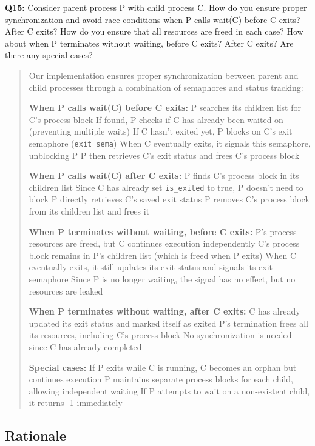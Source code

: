 \documentclass[a4paper,11pt]{paper}
\begin{document}
\textbf{Q15:} Consider parent process P with child process C.  How do you ensure proper synchronization and avoid race conditions when P calls wait(C) before C exits?  After C exits?  How do you ensure that all resources are freed in each case? How about when P terminates without waiting, before C exits?  After C exits?  Are there any special cases?
\begin{quote}
Our implementation ensures proper synchronization between parent and child processes through a combination of semaphores and status tracking:

\textbf{When P calls wait(C) before C exits:}
P searches its children list for C's process block
If found, P checks if C has already been waited on (preventing multiple waits)
If C hasn't exited yet, P blocks on C's exit semaphore (\texttt{exit\_sema})
When C eventually exits, it signals this semaphore, unblocking P
 P then retrieves C's exit status and frees C's process block

\textbf{When P calls wait(C) after C exits:}
P finds C's process block in its children list
Since C has already set \texttt{is\_exited} to true, P doesn't need to block
P directly retrieves C's saved exit status
P removes C's process block from its children list and frees it

\textbf{When P terminates without waiting, before C exits:}
P's process resources are freed, but C continues execution independently
C's process block remains in P's children list (which is freed when P exits)
When C eventually exits, it still updates its exit status and signals its exit semaphore
Since P is no longer waiting, the signal has no effect, but no resources are leaked

\textbf{When P terminates without waiting, after C exits:}
C has already updated its exit status and marked itself as exited
P's termination frees all its resources, including C's process block
No synchronization is needed since C has already completed

\textbf{Special cases:}
 If P exits while C is running, C becomes an orphan but continues execution
 P maintains separate process blocks for each child, allowing independent waiting
 If P attempts to wait on a non-existent child, it returns -1 immediately
\end{quote}

\subsection{Rationale}
\end{document}
